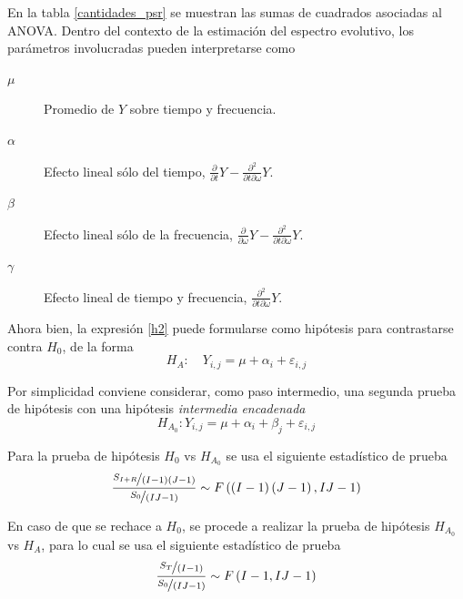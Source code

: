 \documentclass[12pt,letterpaper]{book}
\begin{document}
En la tabla \ref{cantidades_psr} se muestran las sumas de cuadrados asociadas al ANOVA.
%
Dentro del contexto de la estimación del espectro evolutivo, los parámetros involucradas pueden interpretarse como
\begin{description}
\item[$\mu$] Promedio de $Y$ sobre tiempo y frecuencia.
\item[$\alpha$] Efecto lineal sólo del tiempo, $\frac{\partial}{\partial t} Y - \frac{\partial^2}{\partial t \partial \omega} Y$.
\item[$\beta$] Efecto lineal sólo de la frecuencia, $\frac{\partial}{\partial \omega} Y - \frac{\partial^2}{\partial t \partial \omega} Y$.
\item[$\gamma$] Efecto lineal de tiempo y frecuencia, $\frac{\partial^2}{\partial t \partial \omega} Y$.
\end{description}
%

Ahora bien, la expresión \ref{h2} puede formularse como hipótesis para contrastarse contra $H_0$, de la forma
%
\begin{equation}
H_A : \hspace{1em} Y_{i,j} = \mu + \alpha_i + \varepsilon_{i,j}
\end{equation}

Por simplicidad conviene considerar, como paso intermedio, una segunda prueba de hipótesis con una hipótesis \textit{intermedia} \textit{encadenada}
\begin{equation}
H_{A_0} : Y_{i,j} = \mu + \alpha_i + \beta_j + \varepsilon_{i,j}
\end{equation}

Para la prueba de hipótesis $H_0$ vs $H_{A_0}$ se usa el siguiente estadístico de prueba
\begin{equation}
\frac{\nicefrac{S_{I+R}}{(I-1)(J-1)}}{\nicefrac{S_0}{(IJ-1)}}
\sim F \left(\left(I-1 \right)\left(J-1 \right) , IJ-1 \right)
\end{equation}

En caso de que se rechace a $H_0$, se procede a realizar la prueba de hipótesis $H_{A_0}$ vs $H_{A}$, para lo cual se usa el siguiente estadístico de prueba
\begin{equation}
\frac{\nicefrac{S_{T}}{(I-1)}}{\nicefrac{S_0}{(IJ-1)}}
\sim F \left( I-1  , IJ-1 \right)
\end{equation}
\end{document}

